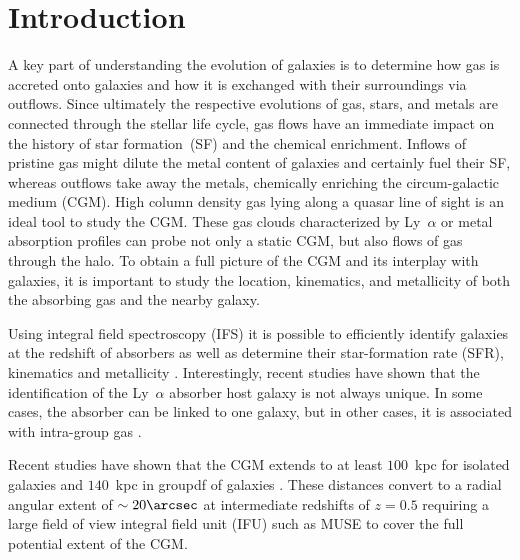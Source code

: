\documentclass[a4paper,fleqn,usenatbib]{mnras}
\begin{document}


\section{Introduction}


A key part of understanding the evolution of galaxies is to determine how gas is accreted onto galaxies and how it is exchanged with their surroundings via outflows. Since ultimately the respective evolutions of gas, stars, and metals are connected through the stellar life cycle, gas flows have an immediate impact on the history of star formation~(SF) and the chemical enrichment. Inflows of pristine gas might dilute the metal content of galaxies and certainly fuel their SF, whereas outflows take away the metals, chemically enriching the circum-galactic medium (CGM). High column density gas lying along a quasar line of sight is an ideal tool to study the CGM. These gas clouds characterized by Ly~$\alpha$ or metal absorption profiles can probe not only a static CGM, but also flows of gas through the halo. To obtain a full picture of the CGM and its interplay with galaxies, it is important to study the location, kinematics, and metallicity of both the absorbing gas and the nearby galaxy. 

Using integral field spectroscopy (IFS) it is possible to efficiently identify galaxies at the redshift of absorbers as well as determine their star-formation rate (SFR), kinematics and metallicity \citep[e.g.][]{Bouche2007sinfoni, Peroux2011sinfoni, Jorgenson2014spatially, Peroux2017nature}. Interestingly, recent studies have shown that the identification of the Ly~$\alpha$ absorber host galaxy is not always unique. In some cases, the absorber can be linked to one galaxy, but in other cases, it is associated with intra-group gas \citep{Whiting2006mos, Kacprzak2010galaxy, Gauthier2013ultra, Rahmani2017observational, Bielby2017probing, Fumagalli2017witnessing, Peroux2017nature}.

Recent studies have shown that the CGM extends to at least $100$~kpc for isolated galaxies \mbox{\citep{Prochaska2017cos}} and $140$~kpc in groupdf of galaxies \mbox{\citep{Bordoloi2011radial}}. These distances convert to a radial angular extent of $\sim20\arcsec$ at intermediate redshifts of $z = 0.5$ requiring a large field of view integral field unit (IFU) such as MUSE to cover the full potential extent of the CGM.
\end{document}
